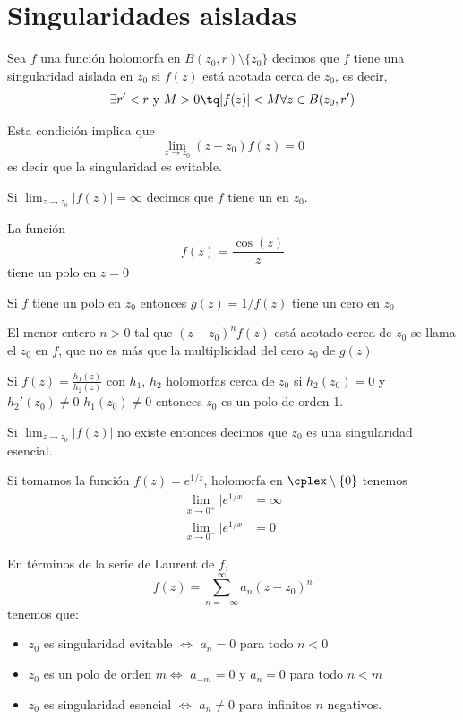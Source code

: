 \documentclass{apuntes}
\begin{document}
\section{Singularidades aisladas}

\begin{defn}
Sea $f$ una función holomorfa en $B(z_0,r)\setminus\{z_0\}$ decimos que $f$ tiene una singularidad aislada en $z_0$ si $f(z)$ está acotada cerca de $z_0$, es decir,
\[\exists r'<r \text{ y } M>0 \tq |f(z)| < M \forall z \in B(z_0, r')\]

Esta condición implica que
\[\lim_{z \to z_0}(z-z_0)f(z)=0\]
es decir que la singularidad es evitable.
\end{defn}

Si $\lim_{z \to z_0}|f(z)|=\infty$ decimos que $f$ tiene un  en $z_0$.

\begin{example}
La función
\[f(z)=\frac{\cos(z)}{z}\]
tiene un polo en $z=0$
\end{example}

\obs Si $f$ tiene un polo en $z_0$ entonces $g(z)=1/f(z)$ tiene un cero en $z_0$

El menor entero $n>0$ tal que $(z-z_0)^nf(z)$ está acotado cerca de $z_0$ se llama el  $z_0$ en $f$, que no es más que la multiplicidad del cero $z_0$ de $g(z)$

\obs Si $f(z)=\frac{h_1(z)}{h_2(z)}$ con $h_1$, $h_2$ holomorfas cerca de $z_0$ si $h_2(z_0)=0$ y $h_2'(z_0)\neq 0$ $h_1(z_0)\neq 0$ entonces $z_0$ es un polo de orden 1.

\begin{defn}
Si $\lim_{z \to z_0} |f(z)|$ no existe entonces decimos que $z_0$ es una singularidad esencial.
\end{defn}

\begin{example}
Si tomamos la función $f(z)=e^{1/z}$, holomorfa en $\cplex \setminus \{0\}$ tenemos
\begin{align}
\lim_{x \to 0^+}|e^{1/x}&=\infty\\
\lim_{x \to 0^-}|e^{1/x}&=0
\end{align}
\end{example}

En términos de la serie de Laurent de $f$,
\[f(z)=\sum_{n=-\infty}^{\infty}a_n(z-z_0)^n\]
tenemos que:
\begin{itemize}
\item $z_0$ es singularidad evitable $\iff$ $a_n=0$ para todo $n < 0$
\item $z_0$ es un polo de orden $m \iff$ $a_{-m}=0$ y $a_n=0$ para todo $n<m$
\item $z_0$ es singularidad esencial $\iff$ $a_n \neq 0$ para infinitos $n$ negativos.
\end{itemize}
\end{document}
